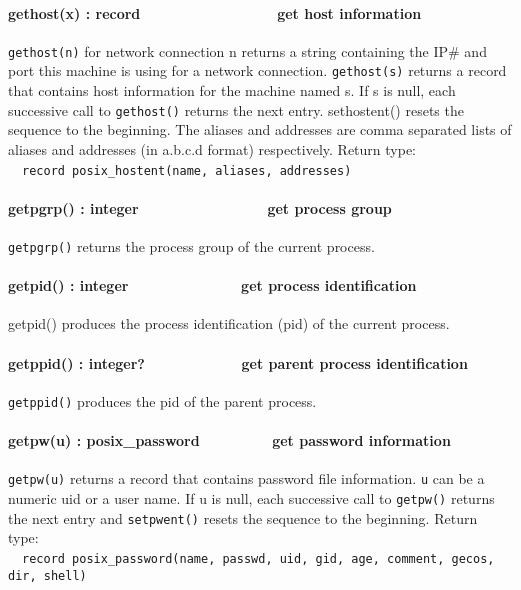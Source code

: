 \paragraph[gethost(x) : record\ \ \ \ \ \ \ \ \ \ 
\ \ \ \ \ \ \ get host information]{gethost(x) :
record\ \ \ \ \ \ \ \ \ \  \ \ \ \ \ \ \ get host information}
\texttt{gethost(n)} for network connection n returns a string containing
the IP# and port this machine is using for a network connection.
\texttt{gethost(s)} returns a record that contains host information for the
machine named s. If s is null, each successive call to \texttt{gethost()}
returns the next entry. sethostent() resets the sequence to the
beginning. The aliases and addresses are comma separated lists of
aliases and addresses (in a.b.c.d format) respectively. Return
type:\\
\ \ \texttt{record posix\_hostent(name, aliases, addresses)}

\paragraph[getpgrp() : integer\ \ \ \ \ \ \ \ \ \ \ \ \ \  \ \ get
process group]{getpgrp() : integer\ \ \ \ \ \ \ \ \ \ \ \ \ \  \ \ get
process group}
\texttt{getpgrp()} returns the process group of the current process. 

\paragraph[getpid() : integer\ \ \ \ \ \ \ \ \ \ \ \  \ \ get process
identification]{getpid() : integer\ \ \ \ \ \ \ \ \ \ \ \  \ \ get
process identification}
getpid() produces the process identification (pid) of the current
process.

\paragraph[getppid() : integer?\ \ \ \ \ \ \ \ \ \  \ \ get parent
process identification]{getppid() : integer?\ \ \ \ \ \ \ \ \ \ 
\ \ get parent process identification}
\texttt{getppid()} produces the pid of the parent process.

\paragraph[getpw(u) : posix\_password\ \ \ \ \ \ \ \  \ get password
information]{getpw(u) : posix\_password\ \ \ \ \ \ \ \  \ get password
information}
\texttt{getpw(u)} returns a record that contains password file
information. \texttt{u} can
be a numeric uid or a user name. If u is null, each successive call to
\texttt{getpw()} returns the next entry and \texttt{setpwent()} resets
the sequence to the beginning. Return type:\\
\ \ \texttt{record posix\_password(name, passwd, uid, gid, age, comment, gecos,
dir, shell)}

